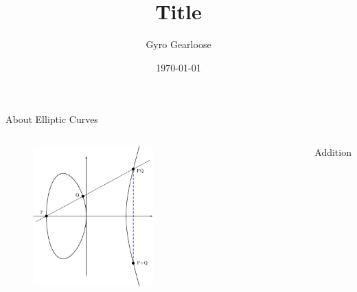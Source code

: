 \documentclass[aspectratio=169]{beamer}
\title              {Title}
\author             {Gyro Gearloose}
\institute          {IGEO, FHNW}
\date               {\today}
\begin{document}
\begin{frame}[t,plain]
\titlepage
\end{frame}


\begin{frame}[c]{About Elliptic Curves}
\begin{columns}[c]
	 \begin{figure}
    	\includegraphics[width=0.5\textwidth]{Figures/ellcurveadd}
	 \end{figure}
	 	Addition
\end{columns}
\end{frame}
\end{document}
